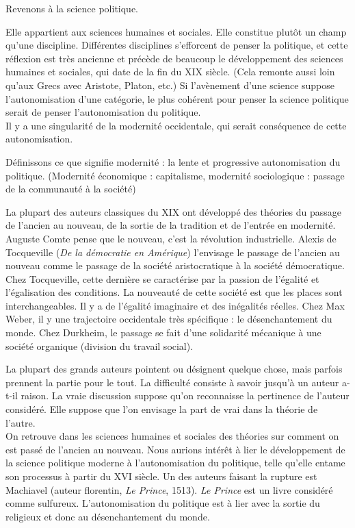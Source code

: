 \documentclass[a4paper,11pt]{article}
\begin{document}
	Revenons à la science politique.

	Elle appartient aux sciences humaines et sociales. Elle constitue plutôt un champ qu’une discipline. Différentes disciplines s’efforcent de penser la politique, et cette réflexion est très ancienne et précède de beaucoup le développement des sciences humaines et sociales, qui date de la fin du XIX siècle. (Cela remonte aussi loin qu’aux Grecs avec Aristote, Platon, etc.) Si l’avènement d’une science suppose l’autonomisation d’une catégorie, le plus cohérent pour penser la science politique serait de penser l’autonomisation du politique.\\

	Il y a une singularité de la modernité occidentale, qui serait conséquence de cette autonomisation.
	
	Définissons ce que signifie modernité : la lente et progressive autonomisation du politique. (Modernité économique : capitalisme, modernité sociologique : passage de la communauté à la société)

	La plupart des auteurs classiques du XIX ont développé des théories du passage de l’ancien au nouveau, de la sortie de la tradition et de l’entrée en modernité. Auguste Comte pense que le nouveau, c’est la révolution industrielle.
	Alexis de Tocqueville (\textit{De la démocratie en Amérique}) l’envisage le passage de l’ancien au nouveau comme le passage de la société aristocratique à la société démocratique.
	Chez Tocqueville, cette dernière se caractérise par la passion de l’égalité et l’égalisation des conditions. La nouveauté de cette société est que les places sont interchangeables.
	Il y a de l’égalité imaginaire et des inégalités réelles.
	Chez Max Weber, il y une trajectoire occidentale très spécifique : le désenchantement du monde.
	Chez Durkheim, le passage se fait d’une solidarité mécanique à une société organique (division du travail social).
	
	La plupart des grands auteurs pointent ou désignent quelque chose, mais parfois prennent la partie pour le tout.
	La difficulté consiste à savoir jusqu’à un auteur a-t-il raison. La vraie discussion suppose qu’on reconnaisse la pertinence de l’auteur considéré. Elle suppose que l’on envisage la part de vrai dans la théorie de l’autre.\\


	On retrouve dans les sciences humaines et sociales des théories sur comment on est passé de l’ancien au nouveau.
	Nous aurions intérêt à lier le développement de la science politique moderne à l’autonomisation du politique, telle qu’elle entame son processus à partir du XVI siècle. Un des auteurs faisant la rupture est Machiavel (auteur florentin, \textit{Le Prince}, 1513).
	\textit{Le Prince} est un livre considéré comme sulfureux.
	L’autonomisation du politique est à lier avec la sortie du religieux et donc au désenchantement du monde.\\
\end{document}
